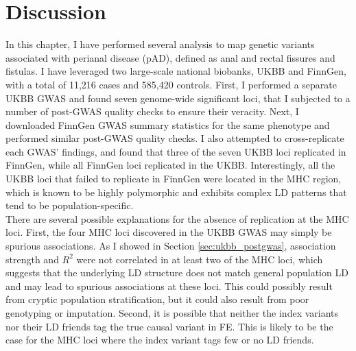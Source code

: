 \newpage
\section{Discussion}
In this chapter, I have performed several analysis to map genetic variants associated with perianal disease (pAD), defined as anal and rectal fissures and fistulas. I have leveraged two large-scale national biobanks, UKBB and FinnGen, with a total of 11,216 cases and 585,420 controls. First, I performed a separate UKBB GWAS and found seven genome-wide significant loci, that I subjected to a number of post-GWAS quality checks to ensure their veracity. Next, I downloaded FinnGen GWAS summary statistics for the same phenotype and performed similar post-GWAS quality checks. I also attempted to cross-replicate each GWAS' findings, and found that three of the seven UKBB loci replicated in FinnGen, while all FinnGen loci replicated in the UKBB. Interestingly, all the UKBB loci that failed to replicate in FinnGen were located in the MHC region, which is known to be highly polymorphic and exhibits complex LD patterns that tend to be population-specific. \\

There are several possible explanations for the absence of replication at the MHC loci. First, the four MHC loci discovered in the UKBB GWAS may simply be spurious associations. As I showed in Section \ref{sec:ukbb_postgwas}, association strength and $R^{2}$ were not correlated in at least two of the MHC loci, which suggests that the underlying LD structure does not match general population LD and may lead to spurious associations at these loci. This could possibly result from cryptic population stratification, but it could also result from poor genotyping or imputation. Second, it is possible that neither the index variants nor their LD friends tag the true causal variant in FE. This is likely to be the case for the MHC loci where the index variant tags few or no LD friends.\\


